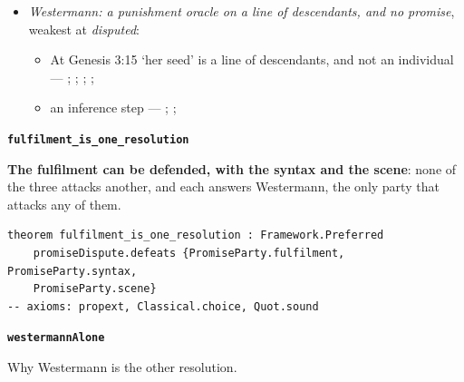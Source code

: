 \documentclass[11pt]{article}
\begin{document}
\begin{itemize}
\item \emph{Westermann: a punishment oracle on a line of descendants, and no promise}, weakest at \emph{disputed}:
\begin{itemize}
\item At Genesis 3:15 ‘her seed’ is a line of descendants, and not an individual --- \cite[259--260]{westermann-genesis-1-11-1984}; \cite[140, 147]{collins-syntactical-note-1997}; \cite[168]{leupold-exposition-genesis-1942}; \cite[363]{alexander-further-observations-1997}; \cite[32]{hamilton-skull-crushing-seed-2006}
\item an inference step --- \cite[259--261]{westermann-genesis-1-11-1984}; \cite[170--171]{calvin-commentary-genesis-1847}; \cite[102]{keil-delitzsch-pentateuch-1866}
\end{itemize}
\end{itemize}
\par\medskip\noindent\textbf{\texttt{fulfilment\_\allowbreak{}is\_\allowbreak{}one\_\allowbreak{}resolution}}\par\nobreak\noindent
\textbf{The fulfilment can be defended, with the syntax and the scene}: none of the three attacks another, and each answers Westermann, the only party that attacks any of them.

{\small\begin{verbatim}
theorem fulfilment_is_one_resolution : Framework.Preferred
    promiseDispute.defeats {PromiseParty.fulfilment, PromiseParty.syntax,
    PromiseParty.scene}
-- axioms: propext, Classical.choice, Quot.sound
\end{verbatim}}
\par\medskip\noindent\textbf{\texttt{westermann\allowbreak{}Alone}}\par\nobreak\noindent
Why Westermann is the other resolution.
\end{document}
